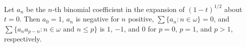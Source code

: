 Let $a_n$ be the $n$-th binomial coefficient in the expansion of $(1 - t)^{1/2}$ about $t = 0$. Then $a_0 = 1$, $a_n$ is negative for $n$ positive, $\sum \{a_n : n \in \omega\} = 0$, and $\sum \{a_n a_{p-n} : n \in \omega \text{ and } n \leq p\}$ is $1$, $-1$, and $0$ for $p = 0$, $p = 1$, and $p > 1$, respectively.
